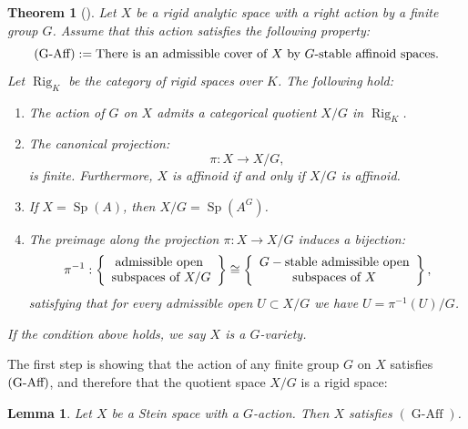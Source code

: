 \documentclass{amsart}
\newtheorem{teo}[defi]{ Theorem}
\newtheorem{Lemma}[defi]{Lemma}
\newcommand{\Sp}{\operatorname{Sp}}
\begin{document}
 \begin{teo}[{\cite{hansen2016quotients}}]\label{teo existence of quotients of rigid spaces by finite groups}
 Let $X$ be a rigid analytic space with a right action by a finite group $G$. Assume that this action satisfies the following property: 
 \begin{equation*}
     \textnormal{(G-Aff)}:= \textnormal{There is an admissible cover of } X \textnormal{ by } G\textnormal{-stable affinoid spaces.}
 \end{equation*}
Let $\operatorname{Rig}_K$ be the category of rigid spaces over $K$. The following hold:
 \begin{enumerate}[label=(\roman*)]
     \item The action of $G$ on $X$ admits a categorical quotient $X/G$ in $\operatorname{Rig}_K$.
     \item The canonical projection:
     \begin{equation*}
         \pi: X\rightarrow X/G,
     \end{equation*}
     is finite. Furthermore, $X$ is affinoid if and only if $X/G$ is affinoid.
     \item If $X=\Sp(A)$, then $X/G=\Sp(A^G)$.
     \item The preimage along the projection $\pi:X\rightarrow X/G$ induces a bijection:
     \begin{equation*}
 \pi^{-1}:\left\{ 
				\begin{array}{c} 
					\textnormal{admissible open }\\ 
					\textnormal{subspaces of } X/G
				\end{array}
\right\} \cong \left\{
				\begin{array}{c}
				 G-\textnormal{stable admissible open}\\
				
				  \textnormal{subspaces of } X
				\end{array}
\right\},
\end{equation*}
     satisfying that for every admissible open $U\subset X/G$ we have $U=\pi^{-1}(U)/G$.
 \end{enumerate}
 If the condition above holds, we say $X$ is a $G$-variety.
 \end{teo}
The first step is showing that the action of any finite group $G$ on $X$ satisfies $(\textnormal{G-Aff})$, and therefore that the quotient space $X/G$ is a rigid space: 
\begin{Lemma}\label{Lemma stein satisfies gaff}
Let $X$ be a Stein space with a  $G$-action. Then $X$ satisfies $(\operatorname{G-Aff})$.   
\end{Lemma}
\end{document}
